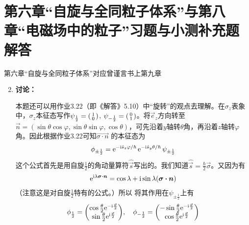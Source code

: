 \section{第六章“自旋与全同粒子体系”与第八章“电磁场中的粒子”习题与小测补充题解答}

第六章“自旋与全同粒子体系”对应曾谨言书上第九章
\begin{enumerate}[label=\textbf{6.\arabic*}, listparindent=\parindent, leftmargin=-0.5mm]

\setcounter{enumi}{1}
\item
{\color{red}\textbf{讨论：}}

本题还可以用作业3.22（即《解答》5.10）中“旋转”的观点去理解。在$\sigma_z$表象中，$\sigma_z$本征态写作$\psi_{\frac{1}{2}}=\smqty(1\\0)$, $\psi_{-\frac{1}{2}}=\smqty(0\\1)$。将$\vec{e}_z$方向转至$\vec{n}=(\sin\theta\cos\varphi,\sin\theta\sin\varphi,\cos\theta)$，可先沿着$y$轴转$\theta$角，再沿着$z$轴转$\varphi$角。因此根据作业3.22可知$\vec{\sigma\cdot n}$
的本征态为
\[\phi_{\pm\frac{1}{2}}=\mathrm{e}^{-\mathrm{i}\hat{s}_z\varphi/\hbar}\,\mathrm{e}^{-\mathrm{i}\hat{s}_y\theta/\hbar}\,\psi_{\pm\frac{1}{2}}\]
这个公式首先是用自旋$\frac{1}{2}$的角动量算符$\hat{\vec{s}}$写出的。我们知道$\hat{\vec{s}}=\frac{\hbar}{2}\vec{\sigma}$。又因为有
\[\mathrm{e}^{\mathrm{i}\lambda\boldsymbol{\sigma\cdot n}} =\cos\lambda + \mathrm{i}\sin\lambda(\boldsymbol{\sigma\cdot n})\]
（注意这是对自旋$\frac{1}{2}$特有的公式。）所以
将其作用在$\psi_{\pm\frac{1}{2}}$上有
\[\phi_{\frac{1}{2}}=\mqty(\cos\frac{\theta}{2}\ee{-\im\frac{\varphi}{2}} \\ \sin\frac{\theta}{2}\ee{\im\frac{\varphi}{2}}),\quad \phi_{-\frac{1}{2}}=\mqty(-\sin\frac{\theta}{2}\ee{-\im\frac{\varphi}{2}}\\\cos\frac{\theta}{2}\ee{\im\frac{\varphi}{2}})\]

\end{enumerate}
